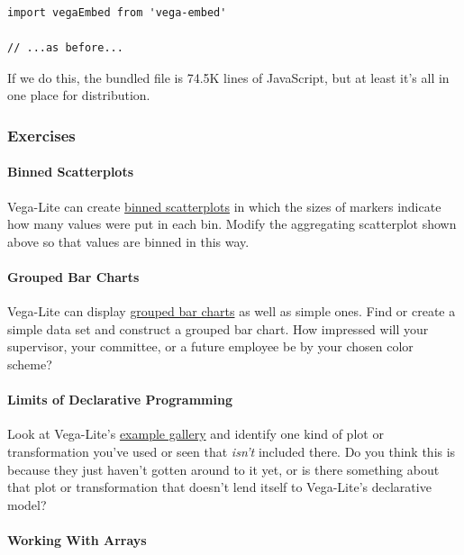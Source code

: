 \begin{verbatim}
import vegaEmbed from 'vega-embed'

// ...as before...
\end{verbatim}

If we do this, the bundled file is 74.5K lines of JavaScript, but at
least it's all in one place for distribution.

\subsubsection{Exercises}\label{s:vis-exercises}

\paragraph{Binned Scatterplots}\label{binned-scatterplots}

Vega-Lite can create
\href{https://vega.github.io/vega-lite/examples/circle_binned.html}{binned
scatterplots} in which the sizes of markers indicate how many values
were put in each bin. Modify the aggregating scatterplot shown above so
that values are binned in this way.

\paragraph{Grouped Bar Charts}\label{grouped-bar-charts}

Vega-Lite can display
\href{https://vega.github.io/vega-lite/examples/bar_grouped.html}{grouped
bar charts} as well as simple ones. Find or create a simple data set and
construct a grouped bar chart. How impressed will your supervisor, your
committee, or a future employee be by your chosen color scheme?

\paragraph{Limits of Declarative
Programming}\label{limits-of-declarative-programming}

Look at Vega-Lite's
\href{https://vega.github.io/vega-lite/examples/}{example gallery} and
identify one kind of plot or transformation you've used or seen that
\emph{isn't} included there. Do you think this is because they just
haven't gotten around to it yet, or is there something about that plot
or transformation that doesn't lend itself to Vega-Lite's declarative
model?

\paragraph{Working With Arrays}\label{working-with-arrays}

